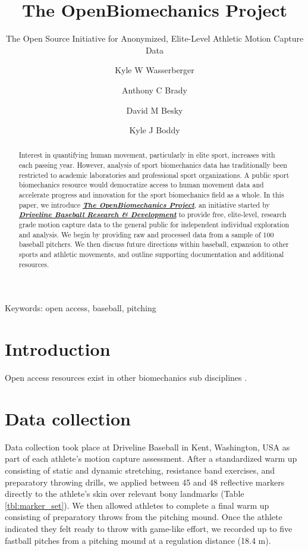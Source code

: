 \documentclass[
]{article}
\author[1,$\dagger$]{\footnotesize Kyle W Wasserberger}
\author[1]{\footnotesize Anthony C Brady}
\author[1]{\footnotesize David M Besky}
\author[1]{\footnotesize Kyle J Boddy}
\affil[1]{\footnotesize Research \& Development; Driveline Baseball}
\affil[$\dagger$]{\footnotesize Corresponding author: kyle.wasserberger@drivelinebaseball.com}
\title{The OpenBiomechanics Project}
\subtitle{The Open Source Initiative for Anonymized, Elite-Level Athletic Motion Capture Data}
\date{\vspace{-2.5em}}
\begin{document}
\maketitle

\begin{center}
Keywords: open access, baseball, pitching
\end{center}

\bigskip
\bigskip
\linenumbers
\doublespacing
\begin{abstract}
Interest in quantifying human movement, particularly in elite sport, increases with each passing year. However, analysis of sport biomechanics data has traditionally been restricted to academic laboratories and professional sport organizations. A public sport biomechanics resource would democratize access to human movement data and accelerate progress and innovation for the sport biomechanics field as a whole. In this paper, we introduce \href{www.openbiomechanics.org}{\textbf{\textit{The OpenBiomechanics Project}}}, an initiative started by \href{https://www.drivelinebaseball.com/research/}{\textbf{\textit{Driveline Baseball Research \& Development}}} to provide free, elite-level, research grade motion capture data to the general public for independent individual exploration and analysis. We begin by providing raw and processed data from a sample of 100 baseball pitchers. We then discuss future directions within baseball, expansion to other sports and athletic movements, and outline supporting documentation and additional resources.
\end{abstract}

\newpage

\hypertarget{introduction}{%
\section{Introduction}\label{introduction}}

Open access resources exist in other biomechanics sub disciplines \cite{camargo2021comprehensive, erdemir2016open}.

\hypertarget{data-collection}{%
\section{Data collection}\label{data-collection}}

Data collection took place at Driveline Baseball in Kent, Washington, USA as part of each athlete's motion capture assessment. After a standardized warm up consisting of static and dynamic stretching, resistance band exercises, and preparatory throwing drills, we applied between 45 and 48 reflective markers directly to the athlete's skin over relevant bony landmarks (Table \ref{tbl:marker_set}). We then allowed athletes to complete a final warm up consisting of preparatory throws from the pitching mound. Once the athlete indicated they felt ready to throw with game-like effort, we recorded up to five fastball pitches from a pitching mound at a regulation distance (18.4 m).
\end{document}
